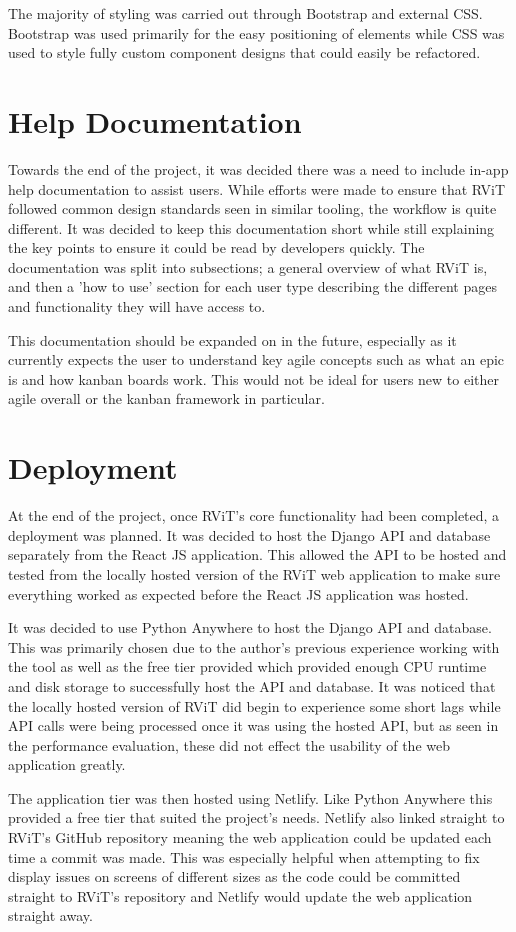 \documentclass[l4proj.tex]{subfiles}
\begin{document}
The majority of styling was carried out through Bootstrap and external CSS. Bootstrap was used primarily for the easy positioning of elements while CSS was used to style fully custom component designs that could easily be refactored. 

\section{Help Documentation}
Towards the end of the project, it was decided there was a need to include in-app help documentation to assist users. While efforts were made to ensure that RViT followed common design standards seen in similar tooling, the workflow is quite different. It was decided to keep this documentation short while still explaining the key points to ensure it could be read by developers quickly. The documentation was split into subsections; a general overview of what RViT is, and then a 'how to use' section for each user type describing the different pages and functionality they will have access to.

This documentation should be expanded on in the future, especially as it currently expects the user to understand key agile concepts such as what an epic is and how kanban boards work. This would not be ideal for users new to either agile overall or the kanban framework in particular. 



\section{Deployment}
At the end of the project, once RViT's core functionality had been completed, a deployment was planned. It was decided to host the Django API and database separately from the React JS application. This allowed the API to be hosted and tested from the locally hosted version of the RViT web application to make sure everything worked as expected before the React JS application was hosted.

It was decided to use Python Anywhere to host the Django API and database. This was primarily chosen due to the author's previous experience working with the tool as well as the free tier provided which provided enough CPU runtime and disk storage to successfully host the API and database. It was noticed that the locally hosted version of RViT did begin to experience some short lags while API calls were being processed once it was using the hosted API, but as seen in the performance evaluation, these did not effect the usability of the web application greatly.

The application tier was then hosted using Netlify. Like Python Anywhere this provided a free tier that suited the project's needs. Netlify also linked straight to RViT's GitHub repository meaning the web application could be updated each time a commit was made. This was especially helpful when attempting to fix display issues on screens of different sizes as the code could be committed straight to RViT's repository and Netlify would update the web application straight away.
\end{document}
